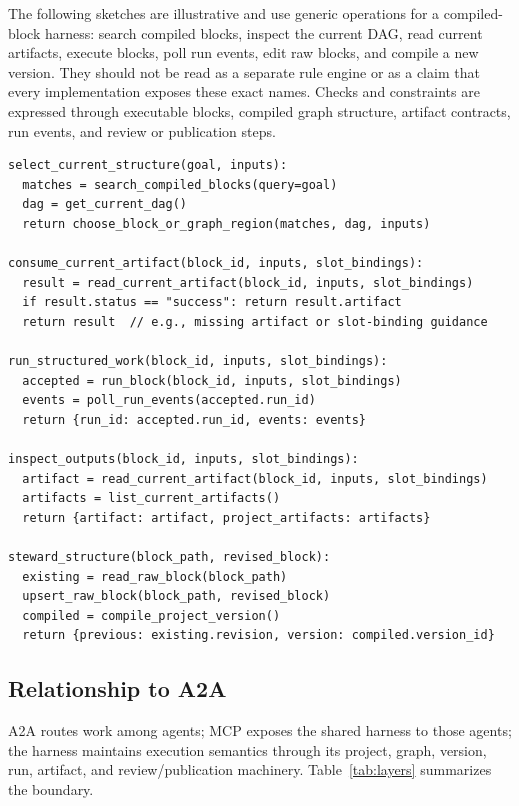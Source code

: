\documentclass{article}
\begin{document}
The following sketches are illustrative and use generic operations for a compiled-block harness: search compiled blocks, inspect the current DAG, read current artifacts, execute blocks, poll run events, edit raw blocks, and compile a new version. They should not be read as a separate rule engine or as a claim that every implementation exposes these exact names. Checks and constraints are expressed through executable blocks, compiled graph structure, artifact contracts, run events, and review or publication steps.

\begin{verbatim}
select_current_structure(goal, inputs):
  matches = search_compiled_blocks(query=goal)
  dag = get_current_dag()
  return choose_block_or_graph_region(matches, dag, inputs)

consume_current_artifact(block_id, inputs, slot_bindings):
  result = read_current_artifact(block_id, inputs, slot_bindings)
  if result.status == "success": return result.artifact
  return result  // e.g., missing artifact or slot-binding guidance

run_structured_work(block_id, inputs, slot_bindings):
  accepted = run_block(block_id, inputs, slot_bindings)
  events = poll_run_events(accepted.run_id)
  return {run_id: accepted.run_id, events: events}

inspect_outputs(block_id, inputs, slot_bindings):
  artifact = read_current_artifact(block_id, inputs, slot_bindings)
  artifacts = list_current_artifacts()
  return {artifact: artifact, project_artifacts: artifacts}

steward_structure(block_path, revised_block):
  existing = read_raw_block(block_path)
  upsert_raw_block(block_path, revised_block)
  compiled = compile_project_version()
  return {previous: existing.revision, version: compiled.version_id}
\end{verbatim}

\subsection{Relationship to A2A}

A2A routes work among agents; MCP exposes the shared harness to those agents; the harness maintains execution semantics through its project, graph, version, run, artifact, and review/publication machinery. Table~\ref{tab:layers} summarizes the boundary.
\end{document}
